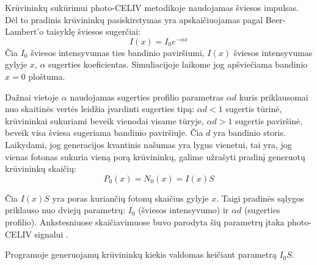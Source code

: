 Krūvininkų sukūrimui photo-CELIV metodikoje naudojamas šviesos impulsas. Dėl to pradinis krūvininkų pasiskirstymas yra apskaičiuojamas pagal Beer-Lambert’o taisyklę šviesos sugerčiai:
\begin{equation}
	I(x)=I_0 e^{-\alpha x}
\end{equation}
Čia \(I_0\) šviesos intensyvumas ties bandinio paviršiumi, \(I(x)\) šviesos intensyvumas gylyje \(x\), \(\alpha\) sugerties koeficientas.
Simuliacijoje laikome jog apšviečiama bandinio \(x=0\) ploštuma.

Dažnai vietoje \(\alpha\) naudojamas sugerties profilio parametras \(\alpha d\) kuris priklausomai nuo skaitinės vertės leidžia įvardinti sugerties tipą: \(\alpha d < 1\) sugertis tūrinė, krūvininkai sukuriami beveik vienodai visame tūryje, \(\alpha d > 1\) sugertis paviršinė, beveik visa šviesa sugeriama bandinio paviršiuje. Čia \(d\) yra bandinio storis.
Laikydami, jog generacijos kvantinis našumas yra lygus vienetui, tai yra, jog vienas fotonas sukuria vieną porą krūvininkų, galime užrašyti pradinį generuotų krūvininkų skaičių:
\begin{equation}
	P_0(x) = N_0(x) = I(x)S
\end{equation}
	
Čia \(I(x)S\) yra poras kuriančių fotonų skaičius gylyje \(x\).
Taigi pradinės sąlygos priklauso nuo dviejų parametrų: \(I_0\) (šviesos intensyvumo) ir \(\alpha d\) (sugerties profilio). Ankstesniuose skaičiavimuose buvo parodyta šių parametrų įtaka photo-CELIV signalui \cite{juška:155202}.

Programoje generuojamų krūvininkų kiekis valdomas keičiant parametrą \(I_0 S\).